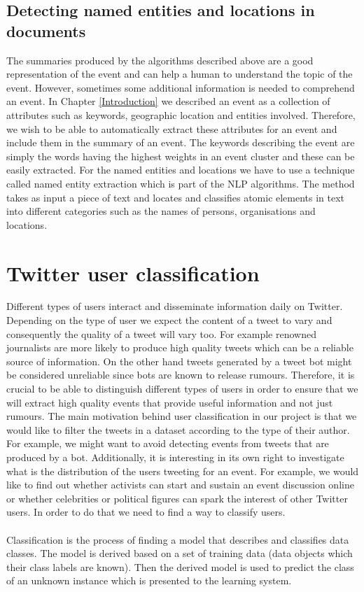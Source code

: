 \subsection{Detecting named entities and locations in documents}
The summaries produced by the algorithms described above are a good representation of the event and can help a human to understand the topic of the event. However, sometimes some additional
information is needed to comprehend an event. In Chapter \ref{Introduction} we described an event as a collection of attributes such as keywords, geographic location and entities involved. Therefore, we wish to be able to automatically extract these attributes for an event and include them in the summary of an event. The keywords describing the event are simply the words having the highest weights in an event cluster and these can be easily extracted. For the named entities and locations we have to use a technique called named entity extraction which is part of the NLP algorithms. The method takes as input a piece of text and locates and classifies atomic elements in text into different categories such as the names of persons, organisations and locations.


\section{Twitter user classification}
Different types of users interact and disseminate information daily on Twitter. Depending on the type of user we expect the content of a tweet to vary and consequently the quality of a tweet will vary too. For example renowned journalists are more likely to produce high quality tweets which can be a reliable source of information. On the other hand tweets generated by a tweet bot might be considered unreliable since bots are known to release rumours. Therefore, it is crucial to be able to distinguish different types of users in order to ensure that we will extract high quality events that provide useful information and not just rumours. The main motivation behind user classification in our project is that we would like to filter the tweets in a dataset according to the type of their author. For example, we might want to avoid detecting events from tweets that are produced by a bot. Additionally, it is interesting in its own right to investigate what is the distribution of the users tweeting for an event. For example, we would like to find out whether activists can start and sustain an event discussion online or whether celebrities or political figures can spark the interest of other Twitter users. In order to do that we need to find a way to classify users.\\\\ 
Classification is the process of finding a model that describes and classifies data classes. The model is derived based on a set of training data (data objects which their class labels are known). Then the derived model is used to predict the class of an unknown instance which is presented to the learning system.    

